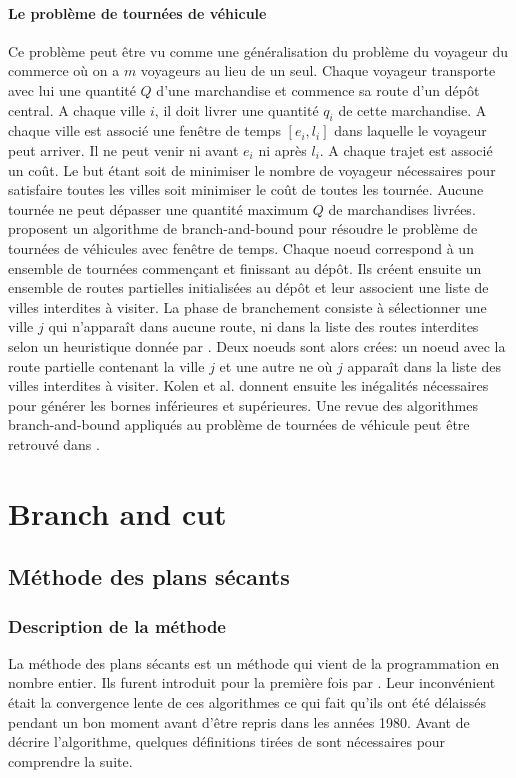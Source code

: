 \documentclass[12pt,a4paper,oneside]{book}
\theoremstyle{definition}
\begin{document}
	 \paragraph{Le problème de tournées de véhicule}
	 Ce problème peut être vu comme une généralisation du problème du voyageur du commerce où on a $m$ voyageurs au lieu de un seul. Chaque voyageur transporte avec lui une quantité $Q$ d'une marchandise et commence sa route d'un dépôt central. A chaque ville $i$, il doit livrer une quantité $q_i$ de cette marchandise. A chaque ville est associé une fenêtre de temps $[e_i,l_i]$ dans laquelle le voyageur peut arriver. Il ne peut venir ni avant $e_i$  ni après $l_i$. A chaque trajet est associé un coût. Le but étant soit de minimiser le nombre de voyageur nécessaires pour satisfaire toutes les villes soit minimiser le coût de toutes les tournée. Aucune tournée ne peut dépasser une quantité maximum $Q$ de marchandises livrées. \cite{kolen1987vehicle} proposent un algorithme de branch-and-bound pour résoudre le problème de tournées de véhicules avec fenêtre de temps. Chaque noeud correspond à un ensemble de tournées commençant et finissant au dépôt. Ils créent ensuite un ensemble de routes partielles initialisées au dépôt et leur associent une liste de villes interdites à visiter. La phase de branchement consiste à sélectionner une ville $j$ qui n'apparaît dans aucune route, ni dans la liste des routes interdites selon un heuristique donnée par \cite{kolen1987vehicle}. Deux noeuds sont alors crées: un noeud avec la route partielle contenant la ville $j$ et une autre ne où $j$ apparaît dans la liste des villes interdites à visiter. Kolen et al. donnent ensuite les inégalités nécessaires pour générer les bornes inférieures et supérieures. Une revue des algorithmes branch-and-bound appliqués au problème de tournées de véhicule peut être retrouvé dans \cite{toth2002branch}.     
	
	
	
	\section{Branch and cut}
	\subsection{Méthode des plans sécants} \label{plansec}
		\subsubsection{Description de la méthode}
		La méthode des plans sécants est un méthode qui vient de la programmation en nombre entier. Ils furent introduit pour la première fois par 
		\cite{gomory1958outline}. Leur inconvénient était la convergence lente de ces algorithmes ce qui fait qu'ils ont été délaissés pendant un bon moment avant d'être repris dans les années 1980. Avant de décrire l'algorithme, quelques définitions tirées de \cite{fukuda2000} sont nécessaires pour comprendre la suite.
		
\end{document}
